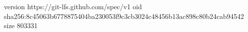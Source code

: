 version https://git-lfs.github.com/spec/v1
oid sha256:8c45063b6778875404ba230053f9c3cb3024c48456b13ac898c80b24cab94542
size 803331
